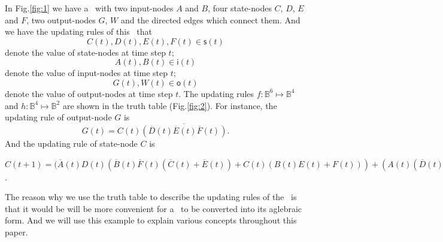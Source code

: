 
\begin{example}
In Fig.\ref{fig:1} we have a \BCN\ with two input-nodes $A$ and $B$, four state-nodes $C$, $D$, $E$ and $F$, two output-nodes $G$, $W$ and the directed edges which connect them. And we have the updating rules of this \BCN\ that 
\[C(t), D(t), E(t), F(t)\in \mathsf{s}(t)\] 
denote the value of state-nodes at time step $t$;
\[A(t), B(t)\in \mathsf{i}(t)\]
 denote the value of input-nodes at time step $t$;
\[G(t), W(t)\in \mathsf{o}(t)\] 
denote the value of output-nodes at time step $t$.
The updating rules $f:\mathbb{B}^{6}\mapsto \mathbb{B}^4$ and $h:\mathbb{B}^4\mapsto \mathbb{B}^2$ are shown in the truth table (Fig.\ref{fig:2}).  For instance, the updating rule of output-node $G$ is 
\[G(t)=C(t)\overline{(\overline{D}(t)\overline{ E}(t)\overline{F}(t))}.\]
And the updating rule of state-node $C$ is 

$C(t+1)=
(\overline{A}(t)D(t) (\overline{B}(t) \overline{F}(t) (\overline{C}(t) + \overline{E}(t)) + 
C(t)(B(t)E(t)+F(t)))+(A(t)(\overline{D}(t)(\overline{B}(t)\overline{C}(t)+\overline{E}(t)F(t)+
\overline{C}(t)F(t))+B(t)E(t)\overline{F}(t)))+(\overline{B}(t)E(t)(C(t)\overline{D}(t)\overline{F}(t)+
D(t)F(t)))(B(t)\overline{E}(t)(\overline{C}(t)F(t)+C(t)\overline{D}(t)))$.

The reason why we use the truth table to describe the updating rules of the \BCN\ is that it would be will be more convenient for a \BCN\ to be converted into its aglebraic form. And we will use this example to explain various concepts throughout this paper.
  \begin{figure}[thpb]
      \centering
      

\end{figure}
\end{example}
